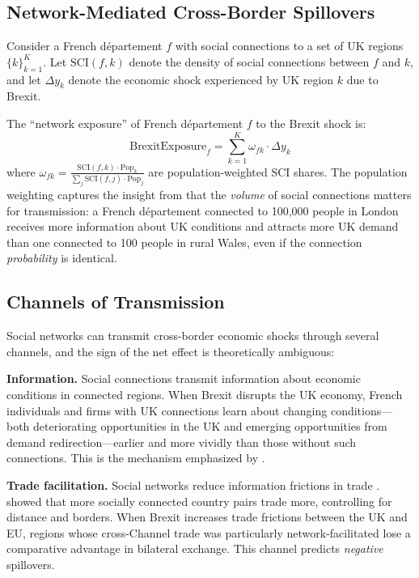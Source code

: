 \documentclass[12pt]{article}
\begin{document}
\subsection{Network-Mediated Cross-Border Spillovers}

Consider a French d\'epartement $f$ with social connections to a set of UK regions $\{k\}_{k=1}^{K}$. Let $\text{SCI}(f,k)$ denote the density of social connections between $f$ and $k$, and let $\Delta y_k$ denote the economic shock experienced by UK region $k$ due to Brexit.

The ``network exposure'' of French d\'epartement $f$ to the Brexit shock is:
\begin{equation}
\text{BrexitExposure}_f = \sum_{k=1}^{K} \omega_{fk} \cdot \Delta y_k
\label{eq:exposure}
\end{equation}
where $\omega_{fk} = \frac{\text{SCI}(f,k) \cdot \text{Pop}_k}{\sum_{j} \text{SCI}(f,j) \cdot \text{Pop}_j}$ are population-weighted SCI shares. The population weighting captures the insight from \citet{bailey2018social} that the \textit{volume} of social connections matters for transmission: a French d\'epartement connected to 100,000 people in London receives more information about UK conditions and attracts more UK demand than one connected to 100 people in rural Wales, even if the connection \textit{probability} is identical.

\subsection{Channels of Transmission}

Social networks can transmit cross-border economic shocks through several channels, and the sign of the net effect is theoretically ambiguous:

\textbf{Information.} Social connections transmit information about economic conditions in connected regions. When Brexit disrupts the UK economy, French individuals and firms with UK connections learn about changing conditions---both deteriorating opportunities in the UK and emerging opportunities from demand redirection---earlier and more vividly than those without such connections. This is the mechanism emphasized by \citet{burchardi2013economic}.

\textbf{Trade facilitation.} Social networks reduce information frictions in trade \citep{rauch1999networks, rauch2001business, chaney2014network}. \citet{bailey2021international} showed that more socially connected country pairs trade more, controlling for distance and borders. When Brexit increases trade frictions between the UK and EU, regions whose cross-Channel trade was particularly network-facilitated lose a comparative advantage in bilateral exchange. This channel predicts \textit{negative} spillovers.
\end{document}
